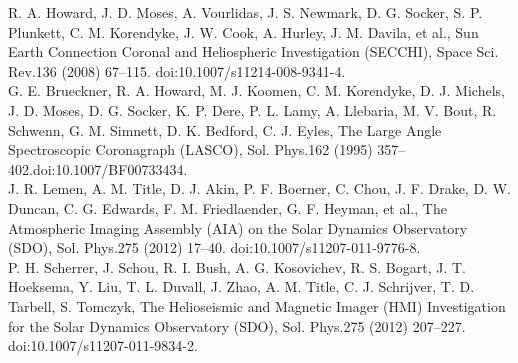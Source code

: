 \documentclass[12pt,a4paper,spanish]{article}
\begin{document}
R. A. Howard, J. D. Moses, A. Vourlidas, J. S. Newmark, D. G. Socker, S. P. Plunkett, C. M. Korendyke, J. W. Cook, A. Hurley, J. M. Davila, et al., Sun Earth Connection Coronal and Heliospheric Investigation (SECCHI), Space Sci. Rev.136 (2008) 67–115. doi:10.1007/s11214-008-9341-4. \\

G. E. Brueckner, R. A. Howard, M. J. Koomen, C. M. Korendyke, D. J. Michels, J. D. Moses, D. G. Socker, K. P. Dere, P. L. Lamy, A. Llebaria, M. V. Bout, R. Schwenn, G. M. Simnett, D. K. Bedford, C. J. Eyles, The Large Angle Spectroscopic Coronagraph (LASCO), Sol. Phys.162 (1995) 357–402.doi:10.1007/BF00733434. \\
J. R. Lemen, A. M. Title, D. J. Akin, P. F. Boerner, C. Chou, J. F. Drake, D. W. Duncan, C. G. Edwards, F. M. Friedlaender, G. F. Heyman, et al., The Atmospheric Imaging Assembly (AIA) on the Solar Dynamics Observatory (SDO), Sol. Phys.275 (2012) 17–40. doi:10.1007/s11207-011-9776-8. \\

P. H. Scherrer, J. Schou, R. I. Bush, A. G. Kosovichev, R. S. Bogart, J. T. Hoeksema, Y. Liu, T. L. Duvall, J. Zhao, A. M. Title, C. J. Schrijver, T. D. Tarbell, S. Tomczyk, The Helioseismic and Magnetic Imager (HMI) Investigation for the Solar Dynamics Observatory (SDO), Sol. Phys.275 (2012) 207–227. doi:10.1007/s11207-011-9834-2. \\
\end{document}
